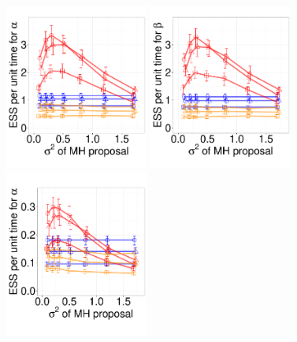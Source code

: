 {%

  \begin{figure}%
  \centering
  \begin{minipage}[!hp]{0.99\linewidth}
  \centering
    \includegraphics [width=0.42\textwidth, angle=0]{figs/pc_3_alpha.pdf}
    \includegraphics [width=0.42\textwidth, angle=0]{figs/pc_3_beta.pdf}
  \centering
    \includegraphics [width=0.42\textwidth, angle=0]{figs/pc_10_alpha.pdf}

\end{minipage}
\end{figure}}
